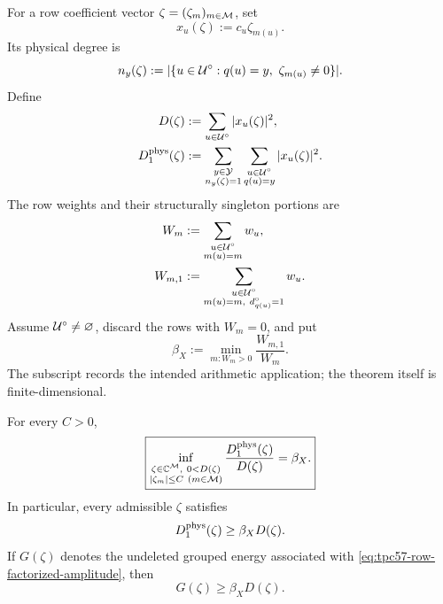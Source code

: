 For a row coefficient vector \(\zeta=(\zeta_m)_{m\in\mathcal M}\), set
\begin{equation}
 x_u(\zeta):=c_u\zeta_{m(u)}.
 \label{eq:tpc57-row-factorized-amplitude}
\end{equation}
Its physical degree is
\begin{equation}
 n_y(\zeta)
 :=|\{u\in\mathcal U^\circ:q(u)=y,\ \zeta_{m(u)}\ne0\}|.
 \label{eq:tpc57-physical-row-degree}
\end{equation}
Define
\begin{align}
 D(\zeta)
 &:=\sum_{u\in\mathcal U^\circ}|x_u(\zeta)|^2,
 \label{eq:tpc57-row-diagonal-energy}\\
 D_1^{\rm phys}(\zeta)
 &:=\sum_{\substack{y\in\mathcal Y\\n_y(\zeta)=1}}
      \sum_{\substack{u\in\mathcal U^\circ\\q(u)=y}}
      |x_u(\zeta)|^2.
 \label{eq:tpc57-row-physical-singleton-energy}
\end{align}
The row weights and their structurally singleton portions are
\begin{align}
 W_m
 &:=\sum_{\substack{u\in\mathcal U^\circ\\m(u)=m}}w_u,
 \label{eq:tpc57-total-row-weight}\\
 W_{m,1}
 &:=\sum_{\substack{u\in\mathcal U^\circ\\m(u)=m,\ d_{q(u)}^\circ=1}}w_u.
 \label{eq:tpc57-singleton-row-weight}
\end{align}
Assume \(\mathcal U^\circ\ne\varnothing\), discard the rows with \(W_m=0\),
and put
\begin{equation}
 \beta_X:=\min_{m:W_m>0}\frac{W_{m,1}}{W_m}.
 \label{eq:tpc57-beta-definition}
\end{equation}
The subscript records the intended arithmetic application; the theorem
itself is finite-dimensional.

\begin{theorem}
\label{thm:tpc57-row-minimax}
For every \(C>0\),
\begin{equation}
 \boxed{
 \inf_{\substack{\zeta\in\mathbb C^{\mathcal M},\ 0<D(\zeta)\\
                   |\zeta_m|\le C\ (m\in\mathcal M)}}
 \frac{D_1^{\rm phys}(\zeta)}{D(\zeta)}
 =\beta_X.}
 \label{eq:tpc57-exact-row-minimax}
\end{equation}
In particular, every admissible \(\zeta\) satisfies
\begin{equation}
 D_1^{\rm phys}(\zeta)\ge\beta_XD(\zeta).
 \label{eq:tpc57-uniform-row-singleton-floor}
\end{equation}
If \(G(\zeta)\) denotes the undeleted grouped energy associated with
\eqref{eq:tpc57-row-factorized-amplitude}, then
\begin{equation}
 G(\zeta)\ge\beta_XD(\zeta).
 \label{eq:tpc57-uniform-row-grouped-floor}
\end{equation}
\end{theorem}

